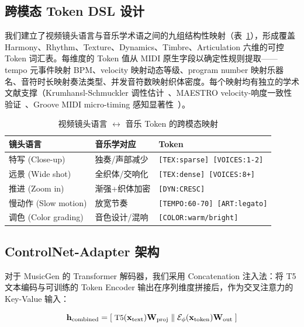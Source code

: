 \documentclass[11pt,twocolumn]{article}
\begin{document}
\subsection{跨模态 Token DSL 设计}

我们建立了视频镜头语言与音乐学术语之间的九组结构性映射（表~\ref{tab:mapping}），形成覆盖 Harmony、Rhythm、Texture、Dynamics、Timbre、Articulation 六维的可控 Token 词汇表。每维度的 Token 值从 MIDI 原生字段以确定性规则提取——tempo 元事件映射 BPM、velocity 映射动态等级、program number 映射乐器名、音符时长映射奏法类型、并发音符数映射织体密度。每个映射均有独立的学术文献支撑（Krumhansl-Schmuckler 调性估计~\cite{krumhansl}、MAESTRO velocity-响度一致性验证~\cite{maestro}、Groove MIDI micro-timing 感知显著性~\cite{groove}）。

\begin{table}[t]
\centering\footnotesize
\caption{视频镜头语言 $\leftrightarrow$ 音乐 Token 的跨模态映射}
\label{tab:mapping}
\begin{tabularx}{\columnwidth}{@{}l >{\raggedright\arraybackslash}X >{\raggedright\arraybackslash}X@{}}
\toprule
\textbf{镜头语言} & \textbf{音乐学对应} & \textbf{Token} \\
\midrule
特写 (Close-up) & 独奏/声部减少 & \texttt{[TEX:sparse] [VOICES:1-2]} \\
远景 (Wide shot) & 全织体/交响化 & \texttt{[TEX:dense] [VOICES:8+]} \\
推进 (Zoom in) & 渐强+织体加密 & \texttt{[DYN:CRESC]} \\
慢动作 (Slow motion) & 放宽节奏 & \texttt{[TEMPO:60-70] [ART:legato]} \\
调色 (Color grading) & 音色设计/混响 & \texttt{[COLOR:warm/bright]} \\
\bottomrule
\end{tabularx}
\end{table}

\subsection{ControlNet-Adapter 架构}

对于 MusicGen 的 Transformer 解码器，我们采用 Concatenation 注入法：将 T5 文本编码与可训练的 Token Encoder 输出在序列维度拼接后，作为交叉注意力的 Key-Value 输入：

\begin{equation}\small
\mathbf{h}_{\text{combined}} = [\;\text{T5}(\mathbf{x}_{\text{text}})\mathbf{W}_{\text{proj}}\;\|\;
\mathcal{E}_{\phi}(\mathbf{x}_{\text{token}})\mathbf{W}_{\text{out}}\;]
\end{equation}
\end{document}
